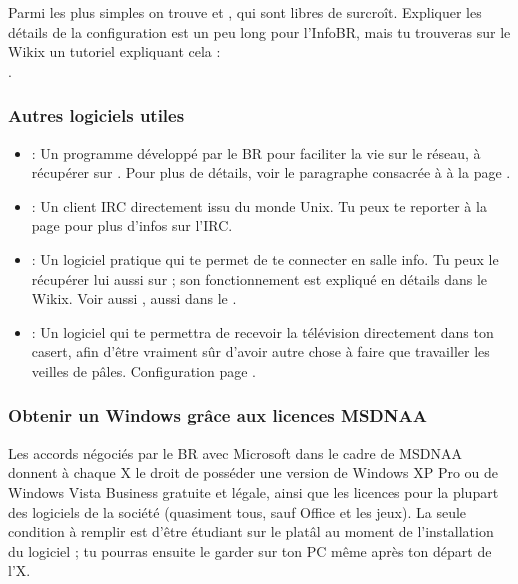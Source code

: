 Parmi les plus simples on trouve  et , qui sont libres de surcro\^{i}t. Expliquer les détails de la configuration est un peu long pour l'InfoBR, mais tu trouveras sur le Wikix un tutoriel expliquant cela : \\
.

\subsubsection{Autres logiciels utiles}

\begin{itemize}
  \item {} : Un programme développé par le BR pour faciliter la vie sur le réseau,
                  à récupérer sur \xshare. Pour plus de détails, voir le paragraphe consacrée
                  à  à la page \pageref{qrezix}.
  \item {} : Un client IRC directement issu du monde Unix.
                 Tu peux te reporter à la page \pageref{irc} pour plus d'infos sur l'IRC.
  \item {} : Un logiciel pratique qui te permet de te connecter en salle info.
                  Tu peux le récupérer lui aussi sur \xshare ;
                  son fonctionnement est expliqué en détails dans le Wikix. Voir aussi , aussi dans le \xshare.
  \item {} : Un logiciel qui te permettra de recevoir la télévision directement dans ton casert, afin d'être vraiment s\^{u}r d'avoir autre chose à faire que travailler les veilles de p\^ales. Configuration page \pageref{TV}.
\end{itemize}


\subsubsection{Obtenir un Windows grâce aux licences MSDNAA}

\label{msdnaa} Les accords négociés par le BR avec Microsoft dans le cadre de MSDNAA donnent à chaque X le droit de posséder une version de Windows
XP Pro ou de Windows Vista Business gratuite et légale, ainsi que les licences pour la plupart des logiciels de la société (quasiment tous, sauf
Office et les jeux). La seule condition à remplir est d'être étudiant sur le platâl au moment de l'installation du logiciel ; tu pourras ensuite le
garder sur ton PC même après ton départ de l'X.

